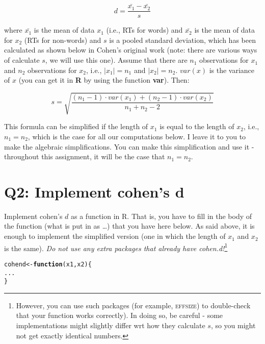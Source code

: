\documentclass{article}\usepackage[]{graphicx}\usepackage[]{color}
\makeatletter
\newcommand{\hlstd}[1]{\textcolor[rgb]{0.345,0.345,0.345}{#1}}%
\newcommand{\hlkwa}[1]{\textcolor[rgb]{0.161,0.373,0.58}{\textbf{#1}}}%
\newcommand{\hlkwb}[1]{\textcolor[rgb]{0.69,0.353,0.396}{#1}}%
\newcommand{\hlkwc}[1]{\textcolor[rgb]{0.333,0.667,0.333}{#1}}%
\newenvironment{kframe}{%
 \def\at@end@of@kframe{}%
 \ifinner\ifhmode%
  \def\at@end@of@kframe{\end{minipage}}%
  \begin{minipage}{\columnwidth}%
 \fi\fi%
 \def\FrameCommand##1{\hskip\@totalleftmargin \hskip-\fboxsep
 \colorbox{shadecolor}{##1}\hskip-\fboxsep
     \hskip-\linewidth \hskip-\@totalleftmargin \hskip\columnwidth}%
 \MakeFramed {\advance\hsize-\width
   \@totalleftmargin\z@ \linewidth\hsize
   \@setminipage}}%
 {\par\unskip\endMakeFramed%
 \at@end@of@kframe}
\newenvironment{knitrout}{}{} %
\makeatother
\begin{document}
\begin{equation}
    d = \frac{\bar{x_1} - \bar{x_2}}{s}
\end{equation}

where $\bar{x_1}$ is the mean of data $x_1$ (i.e., RTs for words) and $\bar{x_2}$ is the mean of data for $x_2$ (RTs for non-words) and $s$ is a pooled standard deviation, which has been calculated as shown below in Cohen's original work (note: there are various ways of calculate $s$, we will use this one).  Assume that there are $n_1$ observations for $x_1$ and $n_2$ observations for $x_2$, i.e., $|x_1|=n_1$ and $|x_2|=n_2$. $var(x)$ is the variance of $x$ (you can get it in \textbf{R} by using the function \textbf{var}). Then:

\begin{equation}
    s=\sqrt{\frac{(n_1-1)\cdot var(x_1) + (n_2-1)\cdot var(x_2)}{n_1+n_2-2}}
\end{equation}

This formula can be simplified if the length of $x_1$ is equal to the length of $x_2$, i.e., $n_1=n_2$, which is the case for all our computations below. I leave it to you to make the algebraic simplifications. You can make this simplification and use it - throughout this assignment, it will be the case that $n_1=n_2$.

\section*{Q2: Implement cohen's d}

Implement cohen's $d$ as a function in R. That is, you have to fill in the body of the function (what is put in as \ldots) that you have here below. As said above, it is enough to implement the simplified version (one in which the length of $x_1$ and $x_2$ is the same). \emph{Do not use any extra packages that already have cohen.d!}\footnote{However, you can use such packages (for example, \textsc{effsize}) to double-check that your function works correctly). In doing so, be careful - some implementations might slightly differ wrt how they calculate $s$, so you might not get exactly identical numbers.}

\begin{knitrout}
\color{fgcolor}\begin{kframe}
\begin{alltt}
\hlstd{cohend} \hlkwb{<-} \hlkwa{function}\hlstd{(}\hlkwc{x1}\hlstd{,} \hlkwc{x2}\hlstd{) \{}
    \hlstd{...}
\hlstd{\}}
\end{alltt}
\end{kframe}
\end{knitrout}
\end{document}
